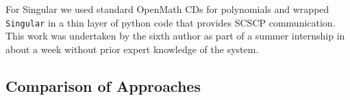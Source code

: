 For Singular we used standard OpenMath CDs for polynomials and wrapped
\texttt{Singular} in a thin layer of python code that provides SCSCP
communication. This work was undertaken by the sixth author as part of a summer
internship in about a week without prior expert
knowledge of the system.

\subsection{Comparison of Approaches}


